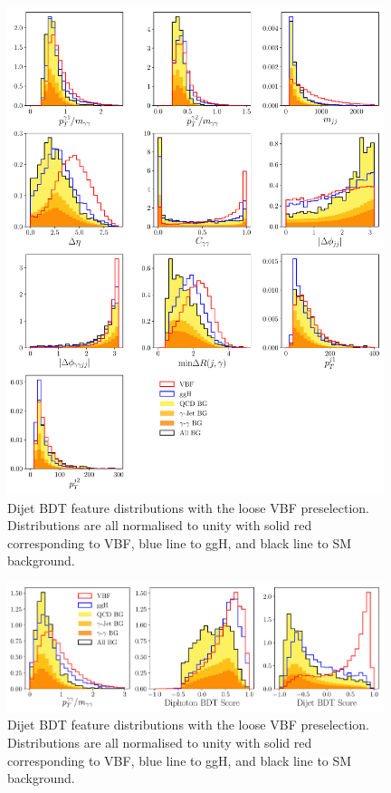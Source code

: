 \begin{figure}[h!]
    \begin{center}
    \includegraphics[width=0.98\textwidth]{figures/appendix_VBFLPS/dijet_BDT_features_splitBG_LPS.pdf}
    \end{center}
    \caption{Dijet BDT feature distributions with the loose VBF preselection. Distributions are all normalised to unity with solid red corresponding to VBF, blue line to ggH, and black line to SM background.}
    \label{fig:vbf_lps_appendix:dijet_bdt_features}
\end{figure}
%
\begin{figure}[h!]
    \begin{center}
    \includegraphics[width=0.98\textwidth]{figures/appendix_VBFLPS/combined_BDT_features_splitBG_LPS.pdf}
    \end{center}
    \caption{Dijet BDT feature distributions with the loose VBF preselection. Distributions are all normalised to unity with solid red corresponding to VBF, blue line to ggH, and black line to SM background.}
    \label{fig:vbf_lps_appendix:dijet_bdt_features}
\end{figure}
